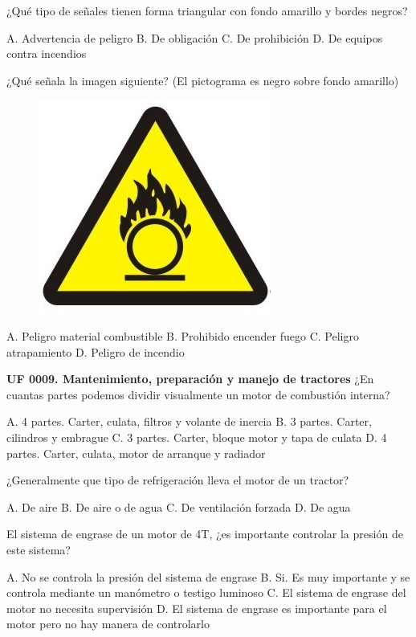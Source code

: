 \documentclass[answers,11pt]{exam}
\begin{document}
{\begin{questions}
  \question ¿Qué tipo de señales tienen forma triangular con fondo amarillo y
    bordes negros?
    \begin{checkboxes}
      \CorrectChoice A. Advertencia de peligro
      \choice B. De obligación
      \choice C. De prohibición
      \choice D. De equipos contra incendios
    \end{checkboxes}
\newpage
  \question ¿Qué señala la imagen siguiente? (El pictograma es negro sobre fondo
    amarillo)
  \begin{figure}[h!]
    \centering
    \includegraphics[scale= 0.6]{images/combustible.jpg}
  \end{figure}
  \begin{checkboxes}
    \CorrectChoice A. Peligro material combustible
    \choice B. Prohibido encender fuego
    \choice C. Peligro atrapamiento
    \choice D. Peligro de incendio
  \end{checkboxes}

  
\newpage  
\textbf{UF 0009. Mantenimiento, preparación y manejo de tractores}  
\question ¿En cuantas partes podemos dividir visualmente un motor de combustión interna? 
\begin{checkboxes}
\choice A. 4 partes. Carter, culata, filtros y volante de inercia
\choice B. 3 partes. Carter, cilindros y embrague 
\CorrectChoice C. 3 partes. Carter, bloque motor y tapa de culata
\choice D. 4 partes. Carter, culata, motor de arranque y radiador    
\end{checkboxes}

\question ¿Generalmente que tipo de refrigeración lleva el motor de un tractor?
\begin{checkboxes}
\choice A. De aire
\choice B. De aire o de agua
\choice C. De ventilación forzada
\CorrectChoice D. De agua
\end{checkboxes}

\question El sistema de engrase de un motor de 4T, ¿es importante controlar la
  presión de este sistema?
\begin{checkboxes}
\choice A. No se controla la presión del sistema de engrase
\CorrectChoice B. Si. Es muy importante y se controla mediante un manómetro o testigo luminoso
\choice C. El sistema de engrase del motor no necesita supervisión
\choice D. El sistema de engrase es importante para el motor pero no hay manera de controlarlo
\end{checkboxes}


\end{questions}}
\end{document}
